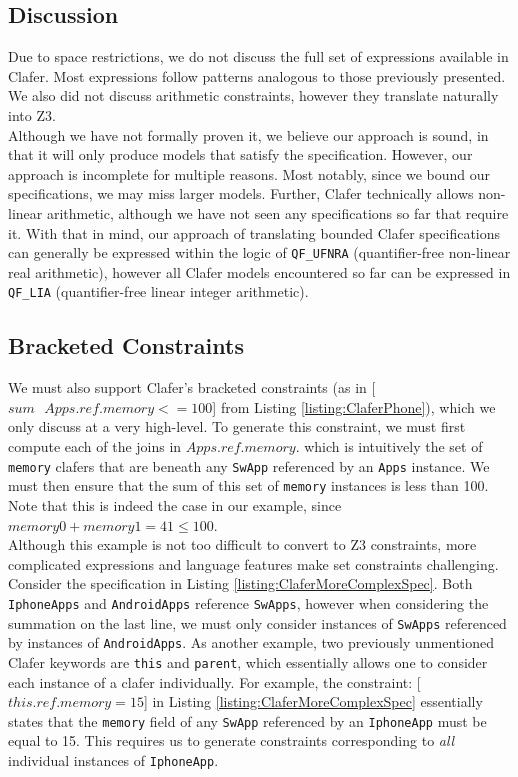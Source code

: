 \documentclass{easychair}
\begin{document}
\subsection{Discussion}
Due to space restrictions, we do not discuss the full set of expressions available in Clafer. Most expressions follow patterns analogous to those previously presented. We also did not discuss arithmetic constraints, however they translate naturally into Z3.\\
\indent Although we have not formally proven it, we believe our approach is sound, in that it will only produce models that satisfy the specification. However, our approach is incomplete for multiple reasons. Most notably, since we bound our specifications, we may miss larger models. Further, Clafer technically allows non-linear arithmetic, although we have not seen any specifications so far that require it. With that in mind, our approach of translating bounded Clafer specifications can generally be expressed within the logic of \texttt{QF\_UFNRA} (quantifier-free non-linear real arithmetic), however all Clafer models encountered so far can be expressed in \texttt{QF\_LIA} (quantifier-free linear integer arithmetic).


\subsection{Bracketed Constraints}

We must also support Clafer's bracketed constraints (as in [$sum\text{ }Apps.ref.memory <= 100$] from Listing \ref{listing:ClaferPhone}), which we only discuss at a very high-level. To generate this constraint, we must first compute each of the joins in $Apps.ref.memory$. which is intuitively the set of \texttt{memory} clafers that are beneath any \texttt{SwApp} referenced by an \texttt{Apps} instance. We must then ensure that the sum of this set of \texttt{memory} instances is less than 100. Note that this is indeed the case in our example, since $memory0 + memory1 =   41 \le 100$.\\
\indent Although this example is not too difficult to convert to Z3 constraints, more complicated expressions and language features make set constraints challenging. Consider the specification in Listing \ref{listing:ClaferMoreComplexSpec}. Both \texttt{IphoneApps} and \texttt{AndroidApps} reference \texttt{SwApps}, however when considering the summation on the last line, we must only consider instances of \texttt{SwApps} referenced by instances of \texttt{AndroidApps}. As another example, two previously unmentioned Clafer keywords are \texttt{this} and \texttt{parent}, which essentially allows one to consider each instance of a clafer individually. For example, the constraint: [$this.ref.memory = 15$] in Listing \ref{listing:ClaferMoreComplexSpec}  essentially states that the \texttt{memory} field of any \texttt{SwApp} referenced by an \texttt{IphoneApp} must be equal to 15. This requires us to generate constraints corresponding to \textit{all} individual instances of \texttt{IphoneApp}.
\end{document}
